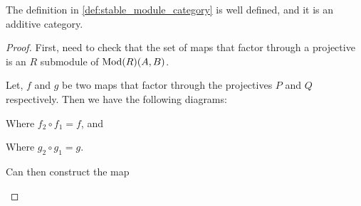 \begin{theorem}
    The definition in \autoref{def:stable_module_category} is well defined, and it is an additive category.
\end{theorem}
\begin{proof}
    First, need to check that the set of maps that factor through a projective is an \( R \) submodule of \( \operatorname{Mod}(R)(A, B) \).

    Let, \( f \) and \( g \) be two maps that factor through the projectives \( P \) and \( Q \) respectively. Then we have the following diagrams:

    \begin{center} %
    \end{center}

    Where \( f_2 \circ f_1 = f \), and

    \begin{center}
    \end{center}

    Where \( g_2 \circ g_1 = g \).

    Can then construct the map

    \begin{center}
    \end{center}


\end{proof}

